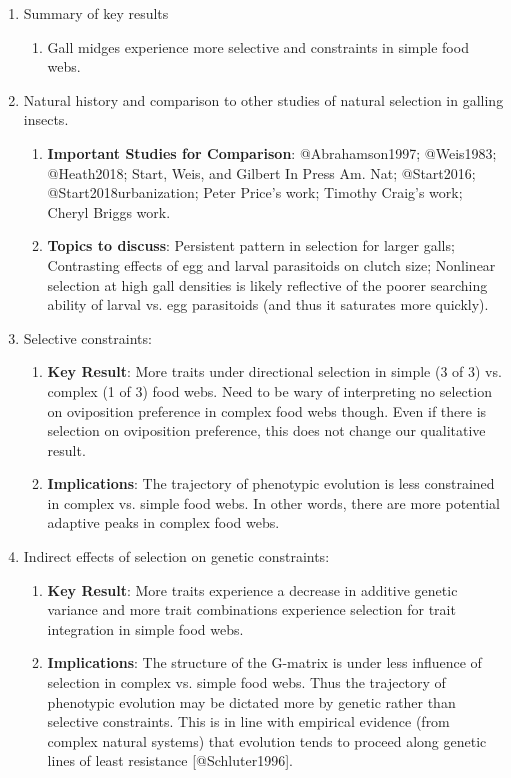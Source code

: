 \documentclass[11pt,]{article}
\begin{document}
\begin{enumerate}

 \item Summary of key results
    \begin{enumerate}
    \item Gall midges experience more selective and constraints in simple food webs.
    \end{enumerate}
 
 \item Natural history and comparison to other studies of natural selection in galling insects.
    \begin{enumerate}
    \item \textbf{Important Studies for Comparison}: @Abrahamson1997; @Weis1983; @Heath2018; Start, Weis, and Gilbert In Press Am. Nat; @Start2016; @Start2018urbanization; Peter Price's work; Timothy Craig's work; Cheryl Briggs work.
    \item \textbf{Topics to discuss}: Persistent pattern in selection for larger galls; Contrasting effects of egg and larval parasitoids on clutch size; Nonlinear selection at high gall densities is likely reflective of the poorer searching ability of larval vs. egg parasitoids (and thus it saturates more quickly).  
    \end{enumerate}
    
 \item Selective constraints:
    \begin{enumerate}
    \item \textbf{Key Result}: More traits under directional selection in simple (3 of 3) vs. complex (1 of 3) food webs. Need to be wary of interpreting no selection on oviposition preference in complex food webs though. Even if there is selection on oviposition preference, this does not change our qualitative result.
    \item \textbf{Implications}: The trajectory of phenotypic evolution is less constrained in complex vs. simple food webs. In other words, there are more potential adaptive peaks in complex food webs. 
    \end{enumerate}
    
 \item Indirect effects of selection on genetic constraints: 
    \begin{enumerate}
    \item \textbf{Key Result}: More traits experience a decrease in additive genetic variance and more trait combinations experience selection for trait integration in simple food webs. 
    \item \textbf{Implications}: The structure of the G-matrix is under less influence of selection in complex vs. simple food webs. Thus the trajectory of phenotypic evolution may be dictated more by genetic rather than selective constraints. This is in line with empirical evidence (from complex natural systems) that evolution tends to proceed along genetic lines of least resistance [@Schluter1996].
    \end{enumerate}
    

\end{enumerate}
\end{document}
